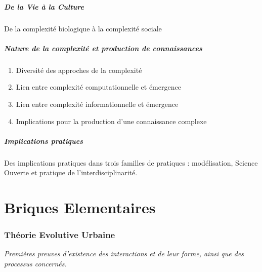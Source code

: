 \subsubsection{De la Vie à la Culture}

De la complexité biologique à la complexité sociale


\subsubsection{Nature de la complexité et production de connaissances}

\begin{enumerate}
	\item Diversité des approches de la complexité
	\item Lien entre complexité computationnelle et émergence
	\item Lien entre complexité informationnelle et émergence
	\item Implications pour la production d'une connaissance complexe
\end{enumerate}





\subsubsection*{Implications pratiques}

Des implications pratiques dans trois familles de pratiques : modélisation, Science Ouverte et pratique de l'interdisciplinarité.












\part{Briques Elementaires}



\section{Théorie Evolutive Urbaine}

\textit{Premières preuves d'existence des interactions et de leur forme, ainsi que des processus concernés.}

